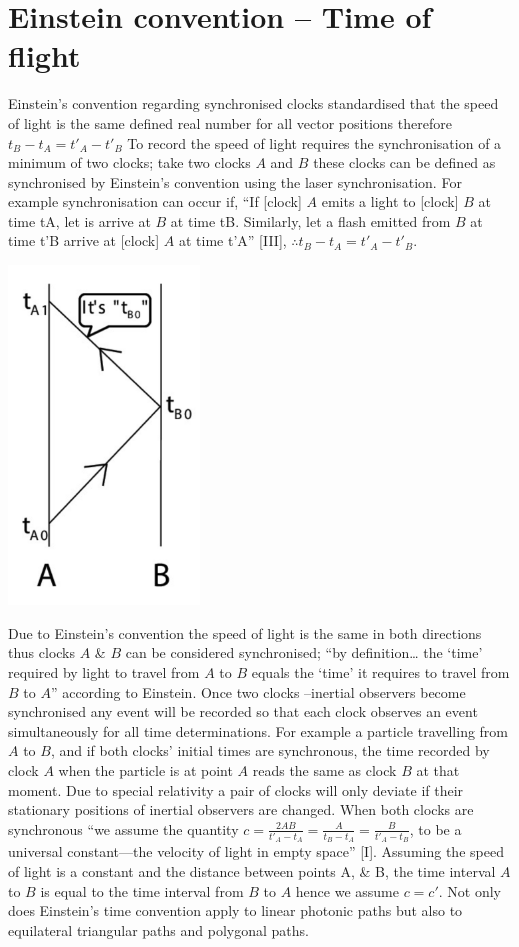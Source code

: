 \documentclass[12pt,letterpaper]{article}
\begin{document}
\section{Einstein convention -- Time of flight}
Einstein's convention regarding synchronised clocks standardised that the speed of light is the same  defined real number for all vector positions therefore $t_B-t_A = t'_A-t'_B$   To record the speed of light requires the synchronisation of a minimum of two clocks; take two clocks $A$ and $B$ these clocks can be defined as synchronised by Einstein's convention using the laser synchronisation. For example synchronisation can occur if, “If [clock] $A$ emits a light to [clock] $B$ at time tA, let is arrive at $B$ at time tB. Similarly, let a flash emitted from $B$ at time t'B arrive at [clock] $A$ at time t'A” [III], $\therefore t_B-t_A = t'_A-t'_B$.
\begin{center}
    \includegraphics[width=2in]{Screenshot 2022-05-07 at 23.38.23.png}
\end{center}
Due to Einstein's convention the speed of light is the same in both directions thus clocks $A$ \& $B$ can be considered synchronised;  “by definition… the ‘time’ required by light to travel from $A$ to $B$ equals the ‘time’ it requires to travel from $B$ to $A$” according to Einstein. Once two clocks –inertial observers become synchronised any event will be recorded so that each clock observes an event simultaneously for all time determinations. For example a particle travelling from $A$ to $B$, and if both clocks' initial times are synchronous, the time recorded by clock $A$ when the particle is at point $A$ reads the same as  clock $B$ at that moment. Due to special relativity a pair of clocks will only deviate if their stationary positions of inertial observers are changed. When both clocks are synchronous “we assume the quantity $c=\frac{2AB}{t'_A-t_A} = \frac{A}{t_B-t_A}=\frac{B}{t'_A-t_B}$, to be a universal constant—the velocity of light in empty space” [I]. Assuming the speed of light is a constant and the distance between points A, & B, the time interval $A$ to $B$ is equal to the time interval from $B$ to $A$ hence we assume $c=c'$. Not only does Einstein's time convention apply to linear photonic paths but also to equilateral triangular paths and polygonal paths. 
\end{document}
